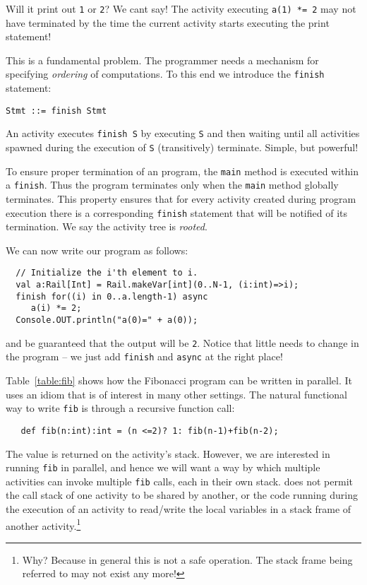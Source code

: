 Will it print out {\tt 1} or {\tt 2}? We cant say! The activity executing {\tt a(1) *= 2} may not have terminated by the time the current activity starts executing the print statement!

This is a fundamental problem. The programmer needs a mechanism for specifying {\em ordering} of computations. To this end we introduce the {\tt finish} statement:

{\footnotesize
\begin{verbatim}
Stmt ::= finish Stmt  
\end{verbatim}}

An activity  executes {\tt finish S} by executing {\tt S} and then waiting until all activities spawned during the execution of {\tt S} (transitively) terminate. Simple, but powerful!

To ensure proper termination of an \Xten{} program, the {\tt main} method is executed within a {\tt finish}. Thus the program terminates only when the {\tt main} method globally terminates. This property ensures that for every activity created during program execution there is a corresponding {\tt finish} statement that will be notified of its termination.  We say the activity tree is {\em rooted}.

We can now write our program as follows:

{\footnotesize
\begin{verbatim}
  // Initialize the i'th element to i.
  val a:Rail[Int] = Rail.makeVar[int](0..N-1, (i:int)=>i);
  finish for((i) in 0..a.length-1) async 
     a(i) *= 2;
  Console.OUT.println("a(0)=" + a(0));
\end{verbatim}}
\noindent and be guaranteed that the output will be {\tt 2}.  Notice
that little needs to change in the program -- we just add {\tt finish}
and {\tt async} at the right place!

Table~\ref{table:fib} shows how the Fibonacci program can be written
in parallel. It uses an idiom that is of interest in many other
settings. The natural functional way to write {\tt fib} is through a recursive function call:
{\footnotesize
\begin{verbatim}
   def fib(n:int):int = (n <=2)? 1: fib(n-1)+fib(n-2);
\end{verbatim}}

\noindent The value is returned on the activity's stack. However, we
are interested in running {\tt fib} in parallel, and hence we will
want a way by which multiple activities can invoke multiple {\tt fib}
calls, each in their own stack. \Xten{} does not permit the call stack
of one activity to be shared by another, or the code running during
the execution of an activity to read/write the local variables in a
stack frame of another activity.\footnote{Why? Because in general this is not a safe operation. The stack frame being referred to may not exist any more!}

